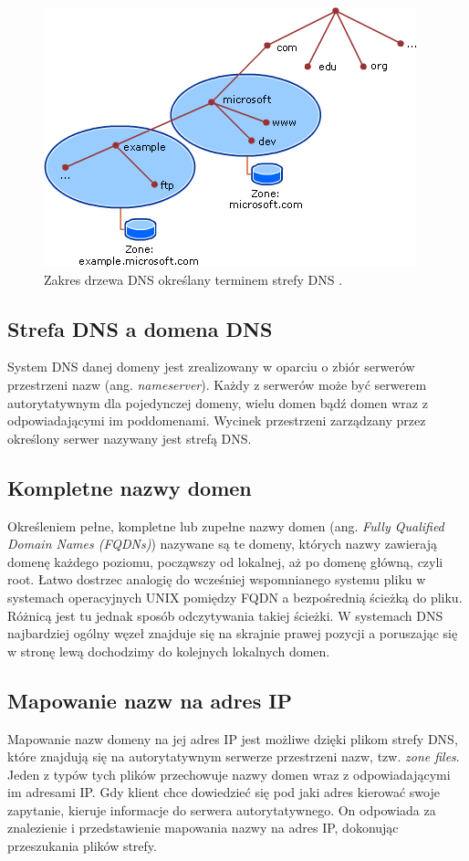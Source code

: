 \begin{center}
	\begin{figure}
	\includegraphics[scale=0.8]{image/zone_example}
	\caption{Zakres drzewa DNS określany terminem strefy DNS \cite{zone_example}.}
	\label{fig:dns_zone_example}
	\end{figure}
\end{center}

\subsection{Strefa DNS a domena DNS}
System DNS danej domeny jest zrealizowany w oparciu o zbiór serwerów przestrzeni nazw (ang. \textit{nameserver}). Każdy z serwerów
może być serwerem autorytatywnym dla pojedynczej domeny, wielu domen bądź domen wraz z odpowiadającymi im poddomenami. Wycinek
przestrzeni zarządzany przez określony serwer nazywany jest strefą DNS.


\subsection{Kompletne nazwy domen}
\label{sec:FQDN}
Określeniem pełne, kompletne lub zupełne nazwy domen (ang. \textit{Fully Qualified Domain Names (FQDNs)}) nazywane są te domeny,
których nazwy zawierają domenę każdego poziomu, począwszy od lokalnej, aż po domenę główną, czyli root. Łatwo dostrzec analogię
do wcześniej wspomnianego systemu pliku w systemach operacyjnych UNIX pomiędzy FQDN a bezpośrednią ścieżką do pliku. Różnicą jest
tu jednak sposób odczytywania takiej ścieżki. W systemach DNS najbardziej ogólny węzeł znajduje się na skrajnie prawej pozycji a
poruszając się w stronę lewą dochodzimy do kolejnych lokalnych domen.

\subsection{Mapowanie nazw na adres IP}
\label{mapping}
Mapowanie nazw domeny na jej adres IP jest możliwe dzięki plikom strefy DNS, które znajdują się na autorytatywnym serwerze
przestrzeni nazw, tzw. \textit{zone files}. Jeden z typów tych plików przechowuje nazwy domen wraz z odpowiadającymi im adresami
IP. Gdy klient chce dowiedzieć się pod jaki adres kierować swoje zapytanie, kieruje informacje do serwera autorytatywnego. On
odpowiada za znalezienie i przedstawienie mapowania nazwy na adres IP, dokonując przeszukania plików strefy.

